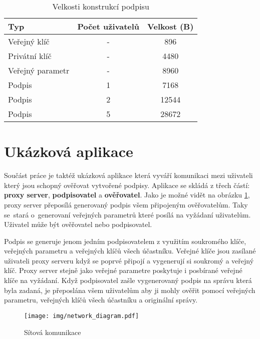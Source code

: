 \begin{table}[htbp]
  \centering
  \caption{Velkosti konstrukcí podpisu}
  \begin{tabular}{|l|c|c|}
    \hline
    Typ              & Počet uživatelů & Velkost (B) \\
    \hline
    Veřejný klíč     & -               & 896         \\
    Privátní klíč    & -               & 4480        \\
    Veřejný parametr & -               & 8960        \\
    Podpis           & 1               & 7168        \\
    Podpis           & 2               & 12544       \\
    Podpis           & 5               & 28672       \\
    \hline
  \end{tabular}
  \label{sizes}
\end{table}


\section{Ukázková aplikace}
Součást práce je taktéž ukázková aplikace která vyváří komunikaci mezi uživateli který jsou schopný ověřovat vytvořené podpisy. Aplikace se skládá z třech částí: \textbf{proxy server}, \textbf{podpisovatel} a \textbf{ověřovatel}. Jako je možné vidět na obrázku \ref{network_diagram}, proxy server přeposílá generovaný podpis všem připojeným ověřovatelům. Taky se~stará o~generovaní veřejných parametrů které posílá na vyžádaní uživatelům. Uživatel může být ověřovatel nebo podpisovatel. 

Podpis se generuje jenom jedním podpisovatelem z využitím soukromého klíče, veřejných parametru a veřejných klíčů všech účastníku. Veřejné klíče jsou zasílané uživateli proxy serveru když se poprvé připojí a vygenerují si soukromý a veřejný klíč. Proxy server stejně jako veřejné parametre poskytuje i posbírané veřejné klíče na vyžádaní. Když podpisovatel zašle vygenerovaný podpis na správu která byla zadaná, je přeposlána všem uživatelům aby ji mohly ověřit pomocí veřejných parametru, veřejných klíčů všech účastníku a originální správy.

\begin{figure}[htbp]
  \centering
  \texttt{[image: img/network\_diagram.pdf]}
  \caption{Sítová komunikace}
  \label{network_diagram}
\end{figure}

